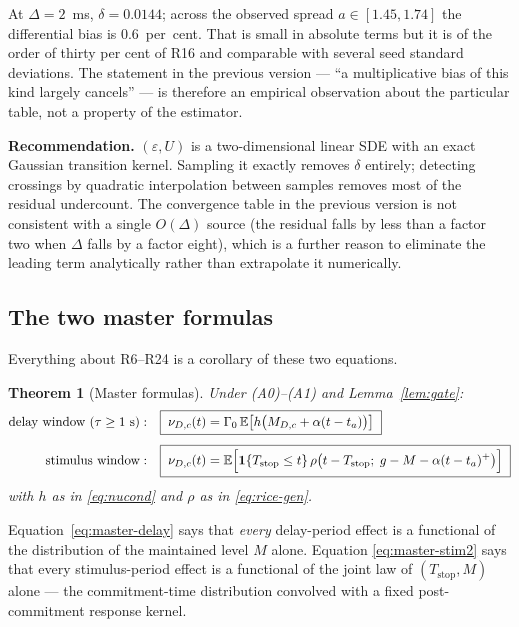 \documentclass[11pt,a4paper]{article}
\newcommand{\E}{\mathbb{E}}
\newcommand{\Tstop}{T_{\text{stop}}}
\newcommand{\Mrv}{M}
\theoremstyle{plain}
\newtheorem{theorem}{Theorem}
\theoremstyle{remark}
\begin{document}
At $\Delta=2$~ms, $\delta=0.0144$; across the observed spread $a\in[1.45,1.74]$ the
differential bias is $0.6$~per~cent. That is small in absolute terms but it is of the
order of thirty per cent of R16 and comparable with several seed standard deviations. The
statement in the previous version --- ``a multiplicative bias of this kind largely
cancels'' --- is therefore an empirical observation about the particular table, not a
property of the estimator.

\textbf{Recommendation.} $(\varepsilon,U)$ is a two-dimensional linear SDE with an exact
Gaussian transition kernel. Sampling it exactly removes $\delta$ entirely; detecting
crossings by quadratic interpolation between samples removes most of the residual
undercount. The convergence table in the previous version is not consistent with a single
$O(\Delta)$ source (the residual falls by less than a factor two when $\Delta$ falls by a
factor eight), which is a further reason to eliminate the leading term analytically rather
than extrapolate it numerically.

\subsection{The two master formulas}
\label{sec:master}

Everything about R6--R24 is a corollary of these two equations.

\begin{theorem}[Master formulas]
\label{thm:master}
Under (A0)--(A1) and Lemma~\ref{lem:gate}:
\begin{align}
\text{delay window }(\tau\ge1\text{ s}):&\quad
\boxed{\;\nu_{D,c}(t)=\Gamma_0\,\E\bigl[h\bigl(\Mrv_{D,c}+\alpha(t-t_a)\bigr)\bigr]\;}
\label{eq:master-delay}\\[4pt]
\text{stimulus window}:&\quad
\boxed{\;\nu_{D,c}(t)=\E\Bigl[\mathbf 1\{\Tstop\le t\}\,
\rho\bigl(t-\Tstop;\;g-\Mrv-\alpha(t-t_a)^{+}\bigr)\Bigr]\;}
\label{eq:master-stim2}
\end{align}
with $h$ as in \eqref{eq:nucond} and $\rho$ as in \eqref{eq:rice-gen}.
\end{theorem}

Equation~\eqref{eq:master-delay} says that \emph{every} delay-period effect is a
functional of the distribution of the maintained level $\Mrv$ alone. Equation
\eqref{eq:master-stim2} says that every stimulus-period effect is a functional of the
joint law of $(\Tstop,\Mrv)$ alone --- the commitment-time distribution convolved with a
fixed post-commitment response kernel.
\end{document}
